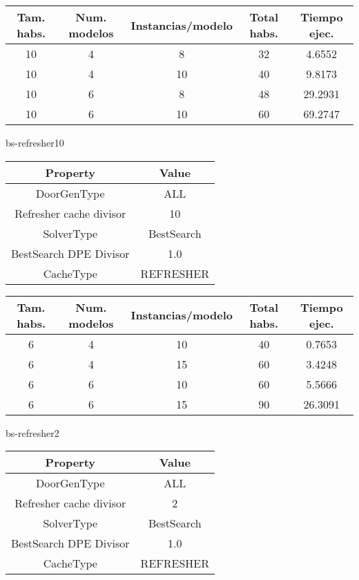 \begin{center}
	\begin{tabular}{ | c | c | c | c | c | }
\hline
Tam. habs. & Num. modelos & Instancias/modelo & Total habs. & Tiempo ejec. \\ \hline 
10 & 4 & 8 & 32 & 4.6552 \\ 
10 & 4 & 10 & 40 & 9.8173 \\ 
10 & 6 & 8 & 48 & 29.2931 \\ 
10 & 6 & 10 & 60 & 69.2747 \\ 
\hline
	\end{tabular}
\end{center}

bs-refresher10
\begin{center}
	\begin{tabular}{ | c | c | }
\hline
 		Property & Value \\ \hline
DoorGenType & ALL \\ 
Refresher cache divisor & 10 \\ 
SolverType & BestSearch \\ 
BestSearch DPE Divisor & 1.0 \\ 
CacheType & REFRESHER \\ 
\hline
	\end{tabular}
\end{center}

\begin{center}
	\begin{tabular}{ | c | c | c | c | c | }
\hline
Tam. habs. & Num. modelos & Instancias/modelo & Total habs. & Tiempo ejec. \\ \hline 
6 & 4 & 10 & 40 & 0.7653 \\ 
6 & 4 & 15 & 60 & 3.4248 \\ 
6 & 6 & 10 & 60 & 5.5666 \\ 
6 & 6 & 15 & 90 & 26.3091 \\ 
\hline
	\end{tabular}
\end{center}

bs-refresher2
\begin{center}
	\begin{tabular}{ | c | c | }
\hline
 		Property & Value \\ \hline
DoorGenType & ALL \\ 
Refresher cache divisor & 2 \\ 
SolverType & BestSearch \\ 
BestSearch DPE Divisor & 1.0 \\ 
CacheType & REFRESHER \\ 
\hline
	\end{tabular}
\end{center}

